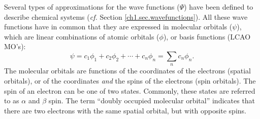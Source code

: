 Several types of approximations for the wave functions ($\Psi$) have been defined to describe chemical systems (\textit{cf.} Section \ref{ch1.sec.wavefunctions}). All these wave functions have in common that they are expressed in molecular orbitals ($\psi$), which are linear combinations of atomic orbitals ($\phi$), or basis functions (LCAO MO's):
\begin{equation}
\psi = c_1 \phi_1 + c_2 \phi_2 + \cdots + c_n \phi_n = \sum_n c_n \phi_n.
\end{equation}
The molecular orbitals are functions of the coordinates of the electrons (spatial orbitals), or of the coordinates \textit{and} the spins of the electrons (spin orbitals). The spin of an electron can be one of two states. Commonly, these states are referred to as $\alpha$ and $\beta$ spin. The term ``doubly occupied molecular orbital'' indicates that there are two electrons with the same spatial orbital, but with opposite spins.

